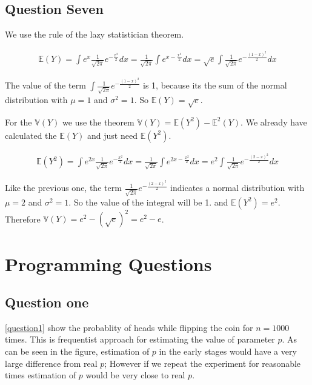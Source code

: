 \documentclass[12pt, a4paper]{book}
\begin{document}
\subsection*{Question Seven}

We use the rule of the lazy statistician theorem.

\begin{eqnarray*}
    \mathbb{E}(Y) = \int e^x \frac{1}{\sqrt{2\pi}}e^{-\frac{x^2}{2}} dx = \frac{1}{\sqrt{2\pi}} \int e^{x-\frac{x^2}{2}} dx = \sqrt{e} \int \frac{1}{\sqrt{2\pi}} e^{-\frac{(1-x)^2}{2}} dx
\end{eqnarray*}

The value of the term $\int \frac{1}{\sqrt{2\pi}} e^{-\frac{(1-x)^2}{2}}$ is 1, because its the sum of the
normal distribution with $\mu=1$ and $\sigma^2 = 1$. So $\mathbb{E}(Y) = \sqrt{e}$.

For the $\mathbb{V}(Y)$ we use the theorem $\mathbb{V}(Y) = \mathbb{E}(Y^2) - \mathbb{E}^2(Y)$. We already
have calculated the $\mathbb{E}(Y)$ and just need $\mathbb{E}(Y^2)$.

\begin{eqnarray*}
    \mathbb{E}(Y^2) = \int e^{2x} \frac{1}{\sqrt{2\pi}}e^{-\frac{x^2}{2}} dx = \frac{1}{\sqrt{2\pi}} \int e^{2x-\frac{x^2}{2}} dx = e^2 \int \frac{1}{\sqrt{2\pi}} e^{-\frac{(2-x)^2}{2}} dx
\end{eqnarray*}

Like the previous one, the term $\frac{1}{\sqrt{2\pi}} e^{-\frac{(2-x)^2}{2}}$ indicates a normal distribution with
$\mu=2$ and $\sigma^2 = 1$. So the value of the integral will be 1. and $\mathbb{E}(Y^2) = e^2$. Therefore $\mathbb{V}(Y) = e^2 - (\sqrt{e})^2 = e^2 - e$.

\section*{Programming Questions}

\subsection*{Question one}

\autoref{question1} show the probablity of heads while flipping the coin for $n=1000$ times.
This is frequentist approach for estimating the value of parameter $p$. As can be seen in the
figure, estimation of $p$ in the early stages would have a very large difference from real $p$;
However if we repeat the experiment for reasonable times estimation of $p$ would be very close to
real $p$.
\end{document}
